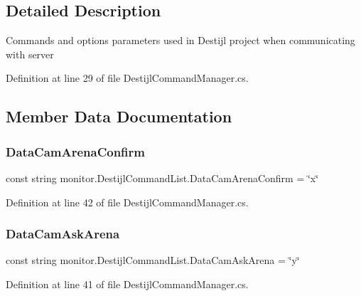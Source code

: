 \subsection{Detailed Description}
Commands and options parameters used in Destijl project when communicating with server 



Definition at line 29 of file Destijl\+Command\+Manager.\+cs.



\subsection{Member Data Documentation}
\mbox{\label{classmonitor_1_1_destijl_command_list_ad31b6758839a4c3b1b6ec4c71635e631}} 
\subsubsection{Data\+Cam\+Arena\+Confirm}
{\footnotesize\ttfamily const string monitor.\+Destijl\+Command\+List.\+Data\+Cam\+Arena\+Confirm = \char`\"{}x\char`\"{}}



Definition at line 42 of file Destijl\+Command\+Manager.\+cs.

\mbox{\label{classmonitor_1_1_destijl_command_list_aaaf85677671db1ef84fe67b2eb954f29}} 
\subsubsection{Data\+Cam\+Ask\+Arena}
{\footnotesize\ttfamily const string monitor.\+Destijl\+Command\+List.\+Data\+Cam\+Ask\+Arena = \char`\"{}y\char`\"{}}



Definition at line 41 of file Destijl\+Command\+Manager.\+cs.

\mbox{\label{classmonitor_1_1_destijl_command_list_a6f578f9d52dd2b50370177a5c03a2af7}} 
